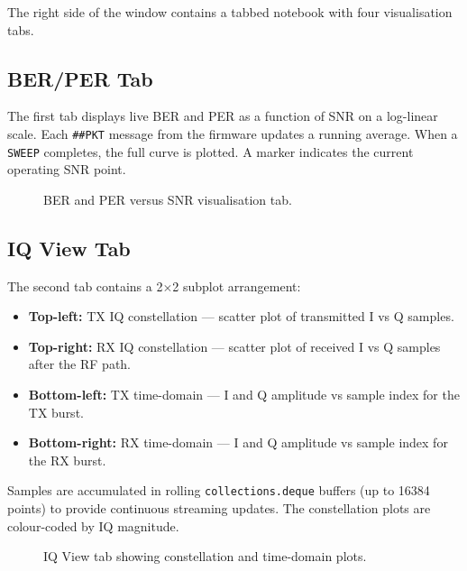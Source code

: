 \documentclass[12pt, a4paper, oneside]{report}
\begin{document}
The right side of the window contains a tabbed notebook with four visualisation tabs.

\subsection{BER/PER Tab}

The first tab displays live BER and PER as a function of SNR on a log-linear scale. Each \texttt{\#\#PKT} message from the firmware updates a running average. When a \texttt{SWEEP} completes, the full curve is plotted. A marker indicates the current operating SNR point.

\begin{figure}[H]
  \centering
  \caption{BER and PER versus SNR visualisation tab.}
  \label{fig:ber_tab}
\end{figure}

\subsection{IQ View Tab}

The second tab contains a 2$\times$2 subplot arrangement:

\begin{itemize}[noitemsep]
  \item \textbf{Top-left:} TX IQ constellation — scatter plot of transmitted I vs Q samples.
  \item \textbf{Top-right:} RX IQ constellation — scatter plot of received I vs Q samples after the RF path.
  \item \textbf{Bottom-left:} TX time-domain — I and Q amplitude vs sample index for the TX burst.
  \item \textbf{Bottom-right:} RX time-domain — I and Q amplitude vs sample index for the RX burst.
\end{itemize}

Samples are accumulated in rolling \texttt{collections.deque} buffers (up to 16384 points) to provide continuous streaming updates. The constellation plots are colour-coded by IQ magnitude.

\begin{figure}[H]
  \centering
  \caption{IQ View tab showing constellation and time-domain plots.}
  \label{fig:iq_tab}
\end{figure}
\end{document}
